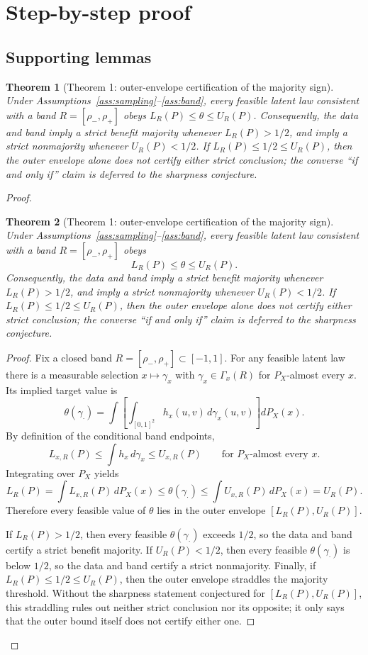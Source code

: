 \documentclass[11pt]{article}
\theoremstyle{definition}
\theoremstyle{plain}
\newtheorem{theorem}{Theorem}
\theoremstyle{remark}
\begin{document}
\section{Step-by-step proof}
\subsection*{Supporting lemmas}

\begin{theorem}[Theorem 1: outer-envelope certification of the majority sign]\label{thm:thm:critical-set}
Under Assumptions~\ref{ass:sampling}--\ref{ass:band}, every feasible latent law consistent with a band \(R=[\rho_-,\rho_+]\) obeys \(L_R(P)\le \theta\le U_R(P)\). Consequently, the data and band imply a strict benefit majority whenever \(L_R(P)>1/2\), and imply a strict nonmajority whenever \(U_R(P)<1/2\). If \(L_R(P)\le 1/2\le U_R(P)\), then the outer envelope alone does not certify either strict conclusion; the converse ``if and only if'' claim is deferred to the sharpness conjecture.
\end{theorem}
\begin{proof}
\begin{theorem}[Theorem 1: outer-envelope certification of the majority sign]\label{thm:critical-set}
Under Assumptions~\ref{ass:sampling}--\ref{ass:band}, every feasible latent law consistent with a band \(R=[\rho_-,\rho_+]\) obeys
\[
L_R(P)\le \theta\le U_R(P).
\]
Consequently, the data and band imply a strict benefit majority whenever \(L_R(P)>1/2\), and imply a strict nonmajority whenever \(U_R(P)<1/2\). If \(L_R(P)\le 1/2\le U_R(P)\), then the outer envelope alone does not certify either strict conclusion; the converse ``if and only if'' claim is deferred to the sharpness conjecture.
\end{theorem}
\begin{proof}
Fix a closed band \(R=[\rho_-,\rho_+]\subset[-1,1]\). For any feasible latent law there is a measurable selection \(x\mapsto \gamma_x\) with \(\gamma_x\in\Gamma_x(R)\) for \(P_X\)-almost every \(x\). Its implied target value is
\[
\theta(\gamma_\cdot)=\int \left[\int_{[0,1]^2} h_x(u,v)\,d\gamma_x(u,v)\right] dP_X(x).
\]
By definition of the conditional band endpoints,
\[
L_{x,R}(P)\le \int h_x\,d\gamma_x\le U_{x,R}(P)
\qquad\text{for }P_X\text{-almost every }x.
\]
Integrating over \(P_X\) yields
\[
L_R(P)=\int L_{x,R}(P)\,dP_X(x)\le \theta(\gamma_\cdot)\le \int U_{x,R}(P)\,dP_X(x)=U_R(P).
\]
Therefore every feasible value of \(\theta\) lies in the outer envelope \([L_R(P),U_R(P)]\).

If \(L_R(P)>1/2\), then every feasible \(\theta(\gamma_\cdot)\) exceeds \(1/2\), so the data and band certify a strict benefit majority. If \(U_R(P)<1/2\), then every feasible \(\theta(\gamma_\cdot)\) is below \(1/2\), so the data and band certify a strict nonmajority. Finally, if \(L_R(P)\le 1/2\le U_R(P)\), then the outer envelope straddles the majority threshold. Without the sharpness statement conjectured for \([L_R(P),U_R(P)]\), this straddling rules out neither strict conclusion nor its opposite; it only says that the outer bound itself does not certify either one.
\end{proof}
\end{proof}
\end{document}
